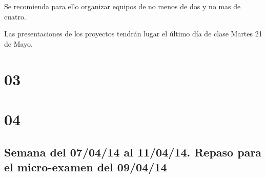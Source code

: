 Se recomienda para ello organizar equipos de no menos de dos y no mas de cuatro.

Las presentaciones de los proyectos tendrán lugar el último día de clase Martes 21 de Mayo.

\section{03}

\section{04}

\subsection{Semana del 07/04/14 al 11/04/14. Repaso para el micro-examen del 09/04/14}

